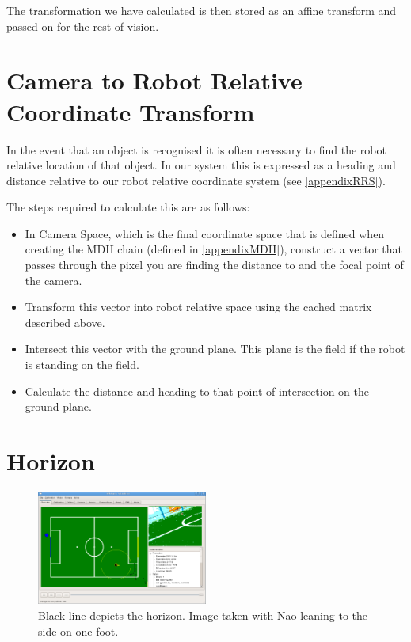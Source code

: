 \documentclass[pdftex,11pt,a4paper]{report}
\begin{document}
The transformation we have calculated is then stored as an affine transform and passed on for the rest of vision.

\section{Camera to Robot Relative Coordinate Transform}

In the event that an object is recognised it is often necessary to find the robot relative location of that object. In our system this is expressed as a heading and distance relative to our robot relative coordinate system (see \autoref{appendixRRS}).

The steps required to calculate this are as follows:

\begin{itemize}
\item In Camera Space, which is the final coordinate space that is defined when
creating the MDH chain (defined in \autoref{appendixMDH}), construct a
vector that passes through the pixel you are finding the distance to and the
focal point of the camera.
\item Transform this vector into robot relative space using the cached matrix described above.
\item Intersect this vector with the ground plane. This plane is the field if the robot is standing on the field. 
\item Calculate the distance and heading to that point of intersection on the ground plane.
\end{itemize}

\section{Horizon}

\begin{figure}[ht]
\centering
\includegraphics[width=0.5\textwidth]{figures/horizon}
\caption{Black line depicts the horizon. Image taken with Nao leaning to
the side on one foot.} \label{figHorizon}
\end{figure}
\end{document}
